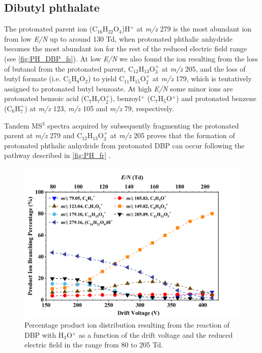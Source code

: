 \subsection{Dibutyl phthalate}

%
The protonated parent ion  (C$_{16}$H$_{22}$O$_4$)H$^+$ at \textit{m/z} 279 is the most abundant ion from low \textit{E/N} up to around 130 Td, when protonated phthalic anhydride becomes the most abundant ion for the rest of the reduced electric field range (see \autoref{fig:PH_DBP_fs}).
%
At low \textit{E/N} we also found the  ion resulting from the loss of butanol from the protonated parent, C$_{12}$H$_{13}$O$_3^+$ at \textit{m/z} 205,  and the loss of butyl formate (i.e. C$_{5}$H$_{8}$O$_2$) to yield C$_{11}$H$_{15}$O$_2^+$ at \textit{m/z} 179, which is tentatively assigned to protonated butyl benzoate.
%
At high \textit{E/N} some minor ions are protonated benzoic acid (C$_{7}$H$_{7}$O$_2^+$), benzoyl$^+$ (C$_7$H$_{5}$O$^+$) and protonated benzene (C$_6$H$_{7}^+$) at \textit{m/z} 123, \textit{m/z} 105 and \textit{m/z} 79, respectively.


Tandem MS$^3$ spectra acquired by subsequently fragmenting the protonated parent at \textit{m/z} 279 and C$_{12}$H$_{13}$O$_3^+$ at \textit{m/z} 205 proves that the formation of protonated phthalic anhydride from protonated DBP can occur following the pathway described in \autoref{fig:PH_fr} \cite{mzcloudDBP}.
%



\begin{figure}[htb]%
\centering
\includegraphics[height=0.35\textheight]{pics/DBP-BR.png}
\caption{Percentage product ion distribution resulting from the reaction of DBP with H$_3$O$^+$ as a function of the drift voltage and the reduced electric field in the range from 80 to 205 Td.}
\label{fig:PH_DBP_fs}
\end{figure}


